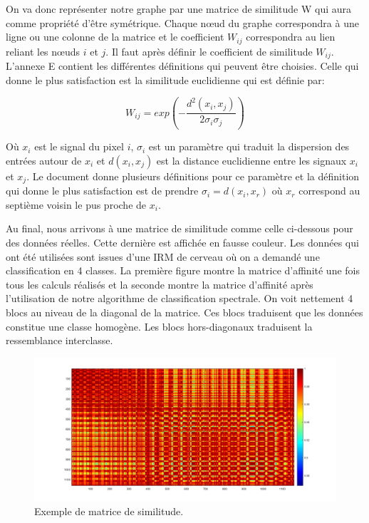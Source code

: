 \medskip

On va donc représenter notre graphe par une matrice de similitude W qui aura comme propriété d'être symétrique. Chaque nœud du graphe correspondra à une ligne ou une colonne de la matrice et le coefficient $W_{ij}$ correspondra au lien reliant les nœuds $i$ et $j$. Il faut après définir le coefficient de similitude $W_{ij}$. L'annexe E contient les différentes définitions qui peuvent être choisies. Celle qui donne le plus satisfaction est la similitude euclidienne qui est définie par: 

\medskip


\begin{equation}
W_{ij} = exp(-\frac{d^2(x_i,x_j)}{2\sigma_i\sigma_j})
\end{equation} 

\medskip


Où $x_i$ est le signal du pixel $i$, $\sigma_i$ est un paramètre qui traduit la dispersion des entrées autour de $x_i$ et $d(x_i,x_j)$ est la distance euclidienne entre les signaux $x_i$ et $x_j$. Le document \cite{mouysset2010contributions} donne plusieurs définitions pour ce paramètre et la définition qui donne le plus satisfaction est de prendre $\sigma_i = d(x_i,x_r)$ où $x_r$ correspond au septième voisin le pus proche de $x_i$. 

\medskip


Au final, nous arrivons à une matrice de similitude comme celle ci-dessous pour des données réelles. Cette dernière est affichée en fausse couleur. Les données qui ont été utilisées sont issues d'une IRM de cerveau où on a demandé une classification en 4 classes. La première figure montre la matrice d'affinité une fois tous les calculs réalisés et la seconde montre la matrice d'affinité après l'utilisation de notre algorithme de classification spectrale. On voit nettement 4 blocs au niveau de la diagonal de la matrice. Ces blocs traduisent que les données constitue une classe homogène. Les blocs hors-diagonaux traduisent la ressemblance interclasse. 

\begin{figure}[H]
\centering
    \includegraphics[scale=0.45,angle=0]{Images/MatrixAffinity2.png}
    \caption{Exemple de matrice de similitude.}
    \label{fig:MatrixAffinity2}
\end{figure}


